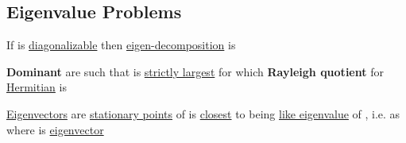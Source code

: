 \subsection*{Eigenvalue Problems}

If  is \underline{diagonalizable} then \underline{eigen-decomposition} is 

\begin{itemize}

      \vItem
            \textbf{Dominant}  are such that
             is \underline{strictly largest} for which
            \tcbbreak
      \vItem
            \textbf{Rayleigh quotient} for \underline{Hermitian}  is

            \begin{itemize}

                  \vItem
                        \underline{Eigenvectors} are \underline{stationary points} of 
                  \vItem
                         is \underline{closest} to being \underline{like eigenvalue}
                        of , i.e. 
                  \vItem
                        as  where \iMbox{\nu} is \underline{eigenvector}
            \end{itemize}
\end{itemize}

\hSep %

